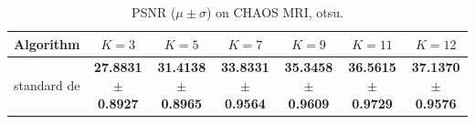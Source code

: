 \begin{table}[htbp]
\centering
\caption{PSNR ($\mu \pm \sigma$) on CHAOS MRI, otsu.}
\label{tab:exp2-otsu-psnr}
\begin{tabular}{lcccccc}
\toprule
Algorithm & $K=3$ & $K=5$ & $K=7$ & $K=9$ & $K=11$ & $K=12$ \\
\midrule
standard de & \textbf{27.8831 $\pm$ 0.8927} & \textbf{31.4138 $\pm$ 0.8965} & \textbf{33.8331 $\pm$ 0.9564} & \textbf{35.3458 $\pm$ 0.9609} & \textbf{36.5615 $\pm$ 0.9729} & \textbf{37.1370 $\pm$ 0.9576} \\
\bottomrule
\end{tabular}
\end{table}